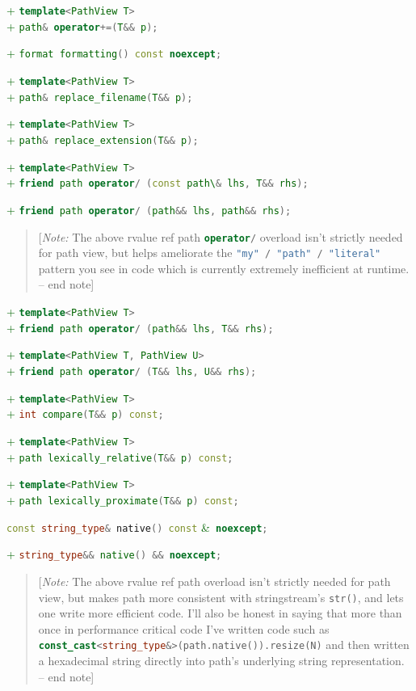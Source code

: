 \documentclass[11pt]{article}
\newcommand{\code}[2][cpp]{\lstinline[language=#1,basicstyle=\small\ttfamily]{#2}}
\newcommand{\note}[1]{\begin{quote}[\textit{Note:} #1 -- end note]\end{quote}}
\newcommand{\tsreplace}[3]{\textcolor{red}{\sout{#1}}#2\textcolor{darkgreen}{#3}}
\begin{document}
\tsreplace{}{}{+ \code{template<PathView T>}}\\
\tsreplace{}{}{+ \code{path& operator+=(T&& p);}}

\tsreplace{}{}{+ \code{format formatting() const noexcept;}}

\tsreplace{}{}{+ \code{template<PathView T>}}\\
\tsreplace{}{}{+ \code{path& replace_filename(T&& p);}}

\tsreplace{}{}{+ \code{template<PathView T>}}\\
\tsreplace{}{}{+ \code{path& replace_extension(T&& p);}}

\tsreplace{}{}{+ \code{template<PathView T>}}\\
\tsreplace{}{}{+ \code{friend path operator/ (const path\& lhs, T&& rhs);}}

\tsreplace{}{}{+ \code{friend path operator/ (path&& lhs, path&& rhs);}}

\note{The above rvalue ref path \code{operator/} overload isn't strictly needed for path view, but helps ameliorate the \code{"my" / "path" / "literal"} pattern you see in code which is currently extremely inefficient at runtime.}

\tsreplace{}{}{+ \code{template<PathView T>}}\\
\tsreplace{}{}{+ \code{friend path operator/ (path&& lhs, T&& rhs);}}

\tsreplace{}{}{+ \code{template<PathView T, PathView U>}}\\
\tsreplace{}{}{+ \code{friend path operator/ (T&& lhs, U&& rhs);}}

\tsreplace{}{}{+ \code{template<PathView T>}}\\
\tsreplace{}{}{+ \code{int compare(T&& p) const;}}

\tsreplace{}{}{+ \code{template<PathView T>}}\\
\tsreplace{}{}{+ \code{path lexically_relative(T&& p) const;}}

\tsreplace{}{}{+ \code{template<PathView T>}}\\
\tsreplace{}{}{+ \code{path lexically_proximate(T&& p) const;}}

\code{const string_type& native() const} \tsreplace{}{}{\&}\code{ noexcept;}

\tsreplace{}{}{+ \code{string_type&& native() && noexcept;}}

\note{The above rvalue ref path overload isn't strictly needed for path view, but makes path more consistent with stringstream's \code{str()}, and lets one write more efficient code. I'll also be honest in saying that more than once in performance critical code I've written code such as \code{const_cast<string_type&>(path.native()).resize(N)} and then written a hexadecimal string directly into path's underlying string representation.}
\end{document}
